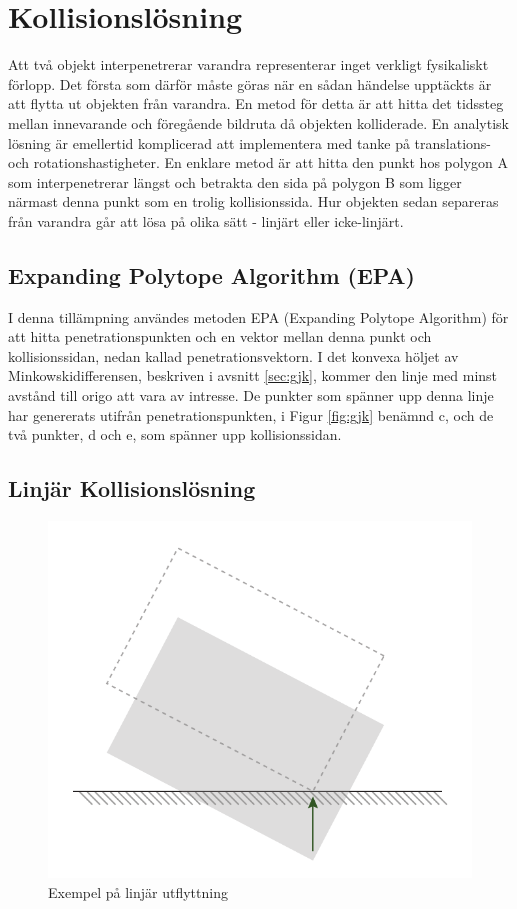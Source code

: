 \documentclass[a4paper,12pt,twopage,swedish]{article}
\begin{document}
\section{Kollisionslösning}
Att två objekt interpenetrerar varandra representerar inget verkligt fysikaliskt förlopp. Det första som därför måste göras när en sådan händelse upptäckts är att flytta ut objekten från varandra. En metod för detta är att hitta det tidssteg mellan innevarande och föregående bildruta då objekten kolliderade. En analytisk lösning är emellertid komplicerad att implementera med tanke på translations- och rotationshastigheter. En enklare metod är att hitta den punkt hos polygon A som interpenetrerar längst och betrakta den sida på polygon B som ligger närmast denna punkt som en trolig kollisionssida. Hur objekten sedan separeras från varandra går att lösa på olika sätt - linjärt eller icke-linjärt.

\subsection{Expanding Polytope Algorithm (EPA)}
I denna tillämpning användes metoden EPA (Expanding Polytope Algorithm) för att hitta penetrationspunkten och en vektor mellan denna punkt och kollisionssidan, nedan kallad penetrationsvektorn. I det konvexa höljet av Minkowskidifferensen, beskriven i avsnitt \ref{sec:gjk}, kommer den linje med minst avstånd till origo att vara av intresse. De punkter som spänner upp denna linje har genererats utifrån penetrationspunkten, i Figur \ref{fig:gjk} benämnd c, och de två punkter, d och e, som spänner upp kollisionssidan.


\subsection{Linjär Kollisionslösning}

\begin{figure}[H]
	\centering
	\includegraphics{illustrations/linear.pdf}
	\caption{Exempel på linjär utflyttning}
	\label{fig:linear}
\end{figure}
\end{document}
